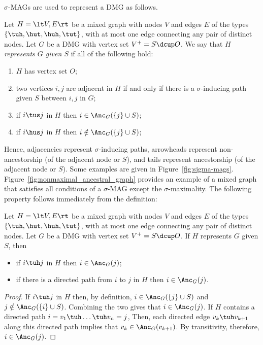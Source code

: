 $\sigma$-MAGs are used to represent a DMG as follows.
\begin{Def}\label{def:sigma-mag_represents_dmg}
  Let $H = \lt V,E\rt$ be a mixed graph with nodes $V$ and edges $E$ of the types $\{\tuh,\hut,\huh,\tut\}$, with at most one edge connecting any pair of distinct nodes.
  Let $G$ be a DMG with vertex set $V^+ = S \dcup O$.
  We say that \emph{$H$ represents $G$ given $S$} if all of the following hold:
  \begin{enumerate}
    \item $H$ has vertex set $O$;
    \item two vertices $i,j$ are adjacent in $H$ if and only if there is a $\sigma$-inducing path given $S$ between $i,j$ in $G$;
    \item if $i \tus j$ in $H$ then $i \in \Anc_{G}(\{j\} \cup S)$;
    \item if $i \hus j$ in $H$ then $i \notin \Anc_{G}(\{j\} \cup S)$;
  \end{enumerate}
\end{Def}
Hence, adjacencies represent $\sigma$-inducing paths, arrowheads represent non-ancestorship (of the adjacent node or $S$), and tails represent ancestorship (of the adjacent node or $S$).
Some examples are given in Figure~\ref{fig:sigma-mags}. 
Figure~\ref{fig:nonmaximal_ancestral_graph} provides an example of a mixed graph that satisfies all conditions of a $\sigma$-MAG except the $\sigma$-maximality.
The following property follows immediately from the definition:
\begin{Prp}\label{prp:sigma-mag_ancestral_relations}
  Let $H = \lt V,E\rt$ be a mixed graph with nodes $V$ and edges $E$ of the types $\{\tuh,\hut,\huh,\tut\}$, with at most one edge connecting any pair of distinct nodes.
  Let $G$ be a DMG with vertex set $V^+ = S \dcup O$.
  If $H$ represents $G$ given $S$, then
  \begin{itemize}
    \item if $i \tuh j$ in $H$ then $i \in \Anc_{G}(j)$;
    \item if there is a directed path from $i$ to $j$ in $H$ then $i \in \Anc_{G}(j)$.
  \end{itemize}
\end{Prp}
\begin{proof}
  If $i \tuh j$ in $H$ then, by definition, $i \in \Anc_{G}(\{j\} \cup S)$ and $j \notin \Anc_{G}(\{i\} \cup S)$.
  Combining the two gives that $i \in \Anc_G(j)$.
  If $H$ contains a directed path $i = v_1 \tuh \dots \tuh v_n = j$,
  Then, each directed edge $v_k \tuh v_{k+1}$ along this directed path implies that $v_k \in \Anc_G(v_{k+1})$. 
  By transitivity, therefore, $i \in \Anc_G(j)$. 
\end{proof}

